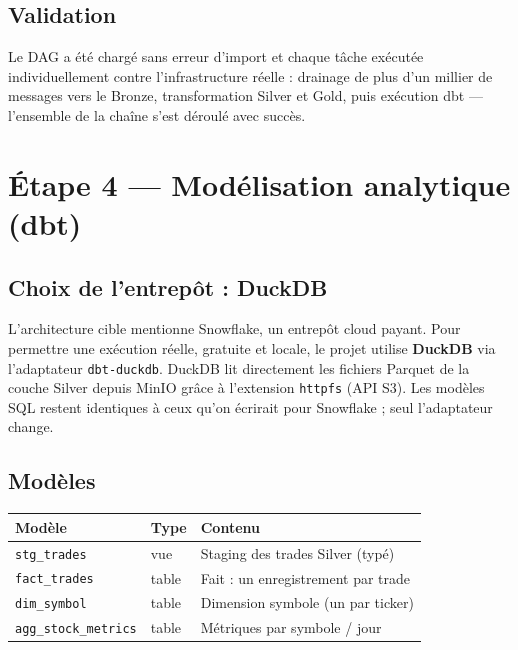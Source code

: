 \documentclass[11pt,a4paper]{article}
\newcommand{\code}[1]{\texttt{\small #1}}
\begin{document}
\subsection{Validation}

Le DAG a été chargé sans erreur d'import et chaque tâche exécutée individuellement
contre l'infrastructure réelle : drainage de plus d'un millier de messages vers
le Bronze, transformation Silver et Gold, puis exécution dbt — l'ensemble de la
chaîne s'est déroulé avec succès.

\section{Étape 4 — Modélisation analytique (dbt)}

\subsection{Choix de l'entrepôt : DuckDB}

L'architecture cible mentionne Snowflake, un entrepôt cloud payant. Pour
permettre une exécution réelle, gratuite et locale, le projet utilise
\textbf{DuckDB} via l'adaptateur \code{dbt-duckdb}. DuckDB lit directement les
fichiers Parquet de la couche Silver depuis MinIO grâce à l'extension
\code{httpfs} (API S3). Les modèles SQL restent identiques à ceux qu'on
écrirait pour Snowflake ; seul l'adaptateur change.

\subsection{Modèles}

\begin{center}
\renewcommand{\arraystretch}{1.25}
\begin{tabularx}{\linewidth}{@{}llX@{}}
\toprule
\textbf{Modèle} & \textbf{Type} & \textbf{Contenu} \\
\midrule
\code{stg\_trades}        & vue   & Staging des trades Silver (typé) \\
\code{fact\_trades}       & table & Fait : un enregistrement par trade \\
\code{dim\_symbol}        & table & Dimension symbole (un par ticker) \\
\code{agg\_stock\_metrics}& table & Métriques par symbole / jour \\
\bottomrule
\end{tabularx}
\end{center}
\end{document}
